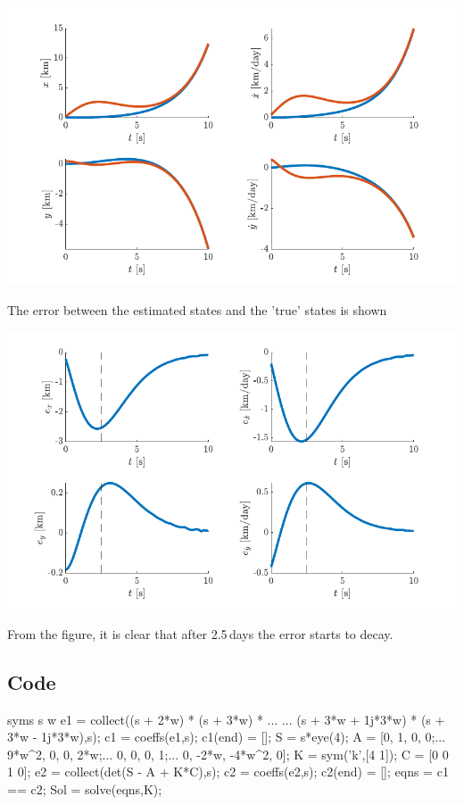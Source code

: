 \includegraphics{figures/ex418.pdf}

The error between the estimated states and the 'true' states is shown 

\includegraphics{figures/ex418_err.pdf}

From the figure, it is clear that after 2.5\,days the error starts to decay.

\subsection*{Code}

\begin{matlabcode}
syms s w
e1 = collect((s + 2*w) * (s + 3*w) * ... 
        ... (s + 3*w + 1j*3*w) * (s + 3*w - 1j*3*w),s);
c1 = coeffs(e1,s); c1(end) = [];
S = s*eye(4);
A = [0, 1, 0, 0;...
     9*w^2, 0, 0, 2*w;...
     0, 0, 0, 1;...
     0, -2*w, -4*w^2, 0]; 
K = sym('k',[4 1]); C = [0 0 1 0];
e2 = collect(det(S - A + K*C),s);
c2 = coeffs(e2,s); c2(end) = [];
eqns = c1 == c2; 
Sol = solve(eqns,K); 
\end{matlabcode}

